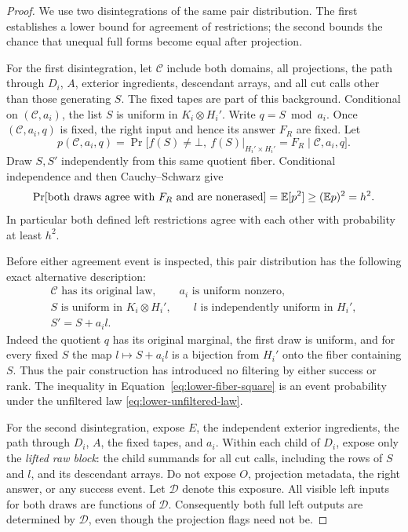 \begin{proof}
We use two disintegrations of the same pair distribution.  The first
establishes a lower bound for agreement of restrictions; the second
bounds the chance that unequal full forms become equal after projection.

For the first disintegration, let $\mathcal C$ include both domains,
all projections, the path through $D_i$, $A$, exterior ingredients,
descendant arrays, and all cut calls other than those generating $S$.
The fixed tapes are part of this background.  Conditional on
$(\mathcal C,a_i)$, the list $S$ is uniform in $K_i\otimes H_i'$.
Write $q=S\bmod a_i$.  Once $(\mathcal C,a_i,q)$ is fixed, the right
input and hence its answer $F_R$ are fixed.  Let
\[
 p(\mathcal C,a_i,q)=
 \Pr\bigl[f(S)\ne\bot,
       \ f(S)|_{H_i'\times H_i'}=F_R
          \mid\mathcal C,a_i,q\bigr].
\]
Draw $S,S'$ independently from this same quotient fiber.  Conditional
independence and then Cauchy--Schwarz give
\begin{equation}\label{eq:lower-fiber-square}
 \Pr[\text{both draws agree with }F_R\text{ and are nonerased}]
   =\mathbb E[p^2]\geq(\mathbb E p)^2=h^2.
\end{equation}
In particular both defined left restrictions agree with each other
with probability at least $h^2$.

Before either agreement event is inspected, this pair distribution has
the following exact alternative description:
\begin{equation}\label{eq:lower-unfiltered-law}
 \begin{gathered}
 \mathcal C\text{ has its original law},\qquad
 a_i\text{ is uniform nonzero},\\
 S\text{ is uniform in }K_i\otimes H_i',\qquad
 l\text{ is independently uniform in }H_i',\\
 S'=S+a_i l.
 \end{gathered}
\end{equation}
Indeed the quotient $q$ has its original marginal, the first draw is
uniform, and for every fixed $S$ the map
$l\mapsto S+a_i l$ is a bijection from $H_i'$ onto the fiber containing
$S$.  Thus the pair construction has introduced no filtering by either
success or rank.  The inequality in Equation~\ref{eq:lower-fiber-square}
is an event probability under the unfiltered law
\eqref{eq:lower-unfiltered-law}.

For the second disintegration, expose $E$, the independent exterior
ingredients, the path through $D_i$, $A$, the fixed tapes, and $a_i$.
Within each child of $D_i$, expose only the \emph{lifted raw block}:
the child summands for all cut calls, including the rows of $S$ and
$l$, and its descendant arrays.  Do not expose $O$, projection metadata,
the right answer, or any success event.  Let $\mathcal D$ denote this
exposure.  All visible left inputs for both draws are functions of
$\mathcal D$.  Consequently both full left outputs are determined by
$\mathcal D$, even though the projection flags need not be.


\end{proof}
